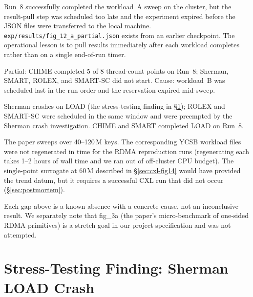 \documentclass[11pt,a4paper]{article}
\begin{document}
\begin{description}[nosep,leftmargin=1em]
    \item[\textbf{fig\_12 workload~A (full sweep).}] Run~8 successfully completed the workload~A sweep on the cluster, but the result-pull step was scheduled too late and the experiment expired before the JSON files were transferred to the local machine. \texttt{exp/results/fig\_12\_a\_partial.json} exists from an earlier checkpoint. The operational lesson is to pull results immediately after each workload completes rather than on a single end-of-run timer.

    \item[\textbf{fig\_12 workload~B.}] Partial: CHIME completed 5 of 8 thread-count points on Run~8; Sherman, SMART, ROLEX, and SMART-SC did not start. Cause: workload~B was scheduled last in the run order and the reservation expired mid-sweep.

    \item[\textbf{fig\_12 workload LOAD for Sherman, ROLEX, SMART-SC.}] Sherman crashes on LOAD (the stress-testing finding in §\ref{sec:stress}); ROLEX and SMART-SC were scheduled in the same window and were preempted by the Sherman crash investigation. CHIME and SMART completed LOAD on Run~8.

    \item[\textbf{fig\_14 (cache consumption).}] The paper sweeps over 40--120\,M keys. The corresponding YCSB workload files were not regenerated in time for the RDMA reproduction runs (regenerating each takes 1--2 hours of wall time and we ran out of off-cluster CPU budget). The single-point surrogate at 60\,M described in §\ref{sec:cxl-fig14} would have provided the trend datum, but it requires a successful CXL run that did not occur (§\ref{sec:postmortem}).
\end{description}

Each gap above is a known absence with a concrete cause, not an inconclusive result. We separately note that fig\_3a (the paper's micro-benchmark of one-sided RDMA primitives) is a stretch goal in our project specification and was not attempted.

\section{Stress-Testing Finding: Sherman LOAD Crash}
\label{sec:stress}
\end{document}
